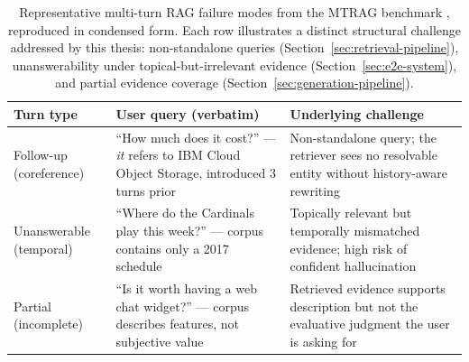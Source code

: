 \begin{table}[h]
\centering
\small
\begin{tabular}{p{2.6cm}p{4.6cm}p{6.2cm}}
\toprule
\textbf{Turn type} & \textbf{User query (verbatim)} & \textbf{Underlying challenge} \\
\midrule
Follow-up (coreference) & ``How much does it cost?'' --- \textit{it} refers to IBM Cloud Object Storage, introduced 3 turns prior & Non-standalone query; the retriever sees no resolvable entity without history-aware rewriting \\
Unanswerable (temporal) & ``Where do the Cardinals play this week?'' --- corpus contains only a 2017 schedule & Topically relevant but temporally mismatched evidence; high risk of confident hallucination \\
Partial (incomplete) & ``Is it worth having a web chat widget?'' --- corpus describes features, not subjective value & Retrieved evidence supports description but not the evaluative judgment the user is asking for \\
\bottomrule
\end{tabular}
\caption{Representative multi-turn RAG failure modes from the MTRAG benchmark \citep{katsis2025mtrag}, reproduced in condensed form. Each row illustrates a distinct structural challenge addressed by this thesis: non-standalone queries (Section~\ref{sec:retrieval-pipeline}), unanswerability under topical-but-irrelevant evidence (Section~\ref{sec:e2e-system}), and partial evidence coverage (Section~\ref{sec:generation-pipeline}).}
\label{tab:intro-example}
\end{table}

